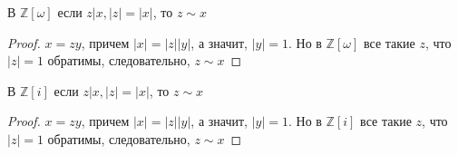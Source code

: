 \documentclass{article}
\begin{document}
\begin{statement}
    В $\mathbb{Z}[\omega]$ если $z | x, |z| = |x|$, то $z \sim x$
\end{statement}

\begin{proof}
    $x = zy$, причем $|x| = |z| |y|$, а значит, $|y| = 1$. Но в $\mathbb{Z}[\omega]$ все такие $z$, что $|z| = 1$
    обратимы, следовательно, $z \sim x$
\end{proof}

\begin{statement}
    В $\mathbb{Z}[i]$ если $z | x, |z| = |x|$, то $z \sim x$
\end{statement}

\begin{proof} 
    $x = zy$, причем $|x| = |z| |y|$, а значит, $|y| = 1$. Но в $\mathbb{Z}[i]$ все такие $z$, что $|z| = 1$
    обратимы, следовательно, $z \sim x$
\end{proof}
\end{document}
